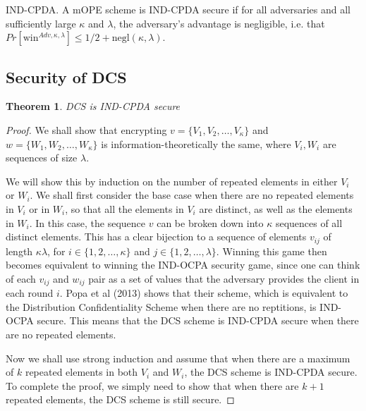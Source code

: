\documentclass[12pt]{article}
\newtheorem{theorem}{Theorem}[section]
\newenvironment{definition}[1][Definition]{\begin{trivlist}
\item[\hskip \labelsep {\bfseries #1}]}{\end{trivlist}}
\begin{document}
\begin{definition}
  IND-CPDA. A mOPE scheme is IND-CPDA secure if for all adversaries and all sufficiently large $\kappa$ and $\lambda$, the adversary's advantage is negligible, i.e. that $Pr[\textrm{win}^{Adv, \kappa, \lambda}] \leq 1/2 + \textrm{negl}(\kappa, \lambda)$.
\end{definition}

\subsection{Security of DCS}

\begin{theorem}
  DCS is IND-CPDA secure 
\end{theorem}
\begin{proof}
We shall show that encrypting $v = \{V_1, V_2, \ldots, V_{\kappa} \}$ and $w = \{W_1, W_2, \ldots, W_{\kappa}\}$ is information-theoretically the same, where $V_i, W_i$ are sequences of size $\lambda$.

We will show this by induction on the number of repeated elements in either $V_i$ or $W_i$. We shall first consider the base case when there are no repeated elements in $V_i$ or in $W_i$, so that all the elements in $V_i$ are distinct, as well as the elements in $W_i$. In this case, the sequence $v$ can be broken down into $\kappa$ sequences of all distinct elements. This has a clear bijection to a sequence of elements $v_{ij}$ of length $\kappa \lambda$, for $i \in \{1, 2, \ldots, \kappa\}$ and $j \in \{1, 2, \ldots, \lambda \}$. Winning this game then becomes equivalent to winning the IND-OCPA security game, since one can think of each $v_{ij}$ and $w_{ij}$ pair as a set of values that the adversary provides the client in each round $i$. Popa et al (2013) shows that their scheme, which is equivalent to the Distribution Confidentiality Scheme when there are no reptitions, is IND-OCPA secure. This means that the DCS scheme is IND-CPDA secure when there are no repeated elements.

Now we shall use strong induction and assume that when there are a maximum of $k$ repeated elements in both $V_i$ and $W_i$, the DCS scheme is IND-CPDA secure. To complete the proof, we simply need to show that when there are $k+1$ repeated elements, the DCS scheme is still secure.


\end{proof}
\end{document}
